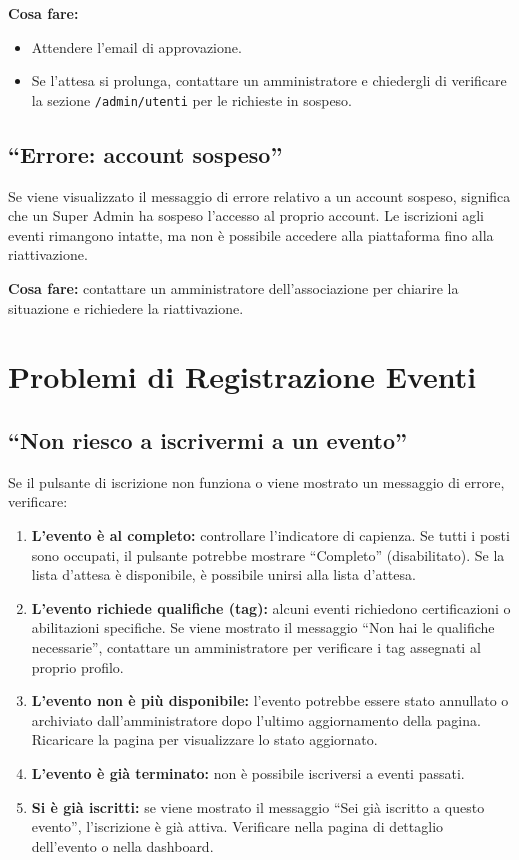 \documentclass[a4paper,11pt,oneside]{book}
\newcommand{\percorso}[1]{\textcolor{namoCyan}{\texttt{#1}}}
\begin{document}
\textbf{Cosa fare:}
\begin{itemize}[leftmargin=1.5em]
  \item Attendere l'email di approvazione.
  \item Se l'attesa si prolunga, contattare un amministratore e chiedergli di verificare la sezione \percorso{/admin/utenti} per le richieste in sospeso.
\end{itemize}

\subsection{``Errore: account sospeso''}

Se viene visualizzato il messaggio di errore relativo a un account sospeso, significa che un Super Admin ha sospeso l'accesso al proprio account. Le iscrizioni agli eventi rimangono intatte, ma non \`e possibile accedere alla piattaforma fino alla riattivazione.

\textbf{Cosa fare:} contattare un amministratore dell'associazione per chiarire la situazione e richiedere la riattivazione.

\section{Problemi di Registrazione Eventi}
\label{sec:problemi-registrazione-eventi}

\subsection{``Non riesco a iscrivermi a un evento''}

Se il pulsante di iscrizione non funziona o viene mostrato un messaggio di errore, verificare:

\begin{enumerate}[leftmargin=1.5em]
  \item \textbf{L'evento \`e al completo:} controllare l'indicatore di capienza. Se tutti i posti sono occupati, il pulsante potrebbe mostrare ``Completo'' (disabilitato). Se la lista d'attesa \`e disponibile, \`e possibile unirsi alla lista d'attesa.
  \item \textbf{L'evento richiede qualifiche (tag):} alcuni eventi richiedono certificazioni o abilitazioni specifiche. Se viene mostrato il messaggio ``Non hai le qualifiche necessarie'', contattare un amministratore per verificare i tag assegnati al proprio profilo.
  \item \textbf{L'evento non \`e pi\`u disponibile:} l'evento potrebbe essere stato annullato o archiviato dall'amministratore dopo l'ultimo aggiornamento della pagina. Ricaricare la pagina per visualizzare lo stato aggiornato.
  \item \textbf{L'evento \`e gi\`a terminato:} non \`e possibile iscriversi a eventi passati.
  \item \textbf{Si \`e gi\`a iscritti:} se viene mostrato il messaggio ``Sei gi\`a iscritto a questo evento'', l'iscrizione \`e gi\`a attiva. Verificare nella pagina di dettaglio dell'evento o nella dashboard.
\end{enumerate}
\end{document}
